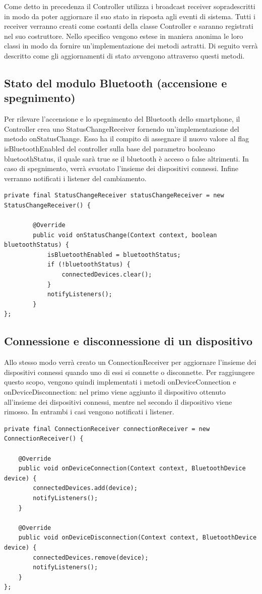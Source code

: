 Come detto in precedenza il Controller utilizza i broadcast receiver sopradescritti in modo da poter aggiornare il suo stato in risposta agli eventi di sistema. Tutti i receiver verranno creati come costanti della classe Controller e saranno registrati nel suo costruttore. Nello specifico vengono estese in maniera anonima le loro classi in modo da fornire un'implementazione dei metodi astratti. Di seguito verrà descritto come gli aggiornamenti di stato avvengono attraverso questi metodi.

\subsection{Stato del modulo Bluetooth (accensione e spegnimento)}
Per rilevare l'accensione e lo spegnimento del Bluetooth dello smartphone, il Controller crea uno StatusChangeReceiver fornendo un'implementazione del metodo onStatusChange. Esso ha il compito di assegnare il nuovo valore al flag isBluetoothEnabled del controller sulla base del parametro booleano bluetoothStatus, il quale sarà true se il bluetooth è acceso o false altrimenti. In caso di spegnimento, verrà svuotato l'insieme dei dispositivi connessi. Infine verranno notificati i listener del cambiamento.
\begin{verbatim}
private final StatusChangeReceiver statusChangeReceiver = new StatusChangeReceiver() {

        @Override
        public void onStatusChange(Context context, boolean bluetoothStatus) {
            isBluetoothEnabled = bluetoothStatus;
            if (!bluetoothStatus) {
                connectedDevices.clear();
            }
            notifyListeners();
        }
};
\end{verbatim}

\subsection{Connessione e disconnessione di un dispositivo}
Allo stesso modo verrà creato un ConnectionReceiver per aggiornare l'insieme dei dispositivi connessi quando uno di essi si connette o disconnette. Per raggiungere questo scopo, vengono quindi implementati i metodi onDeviceConnection e onDeviceDisconnection: nel primo viene aggiunto il dispositivo ottenuto all'insieme dei dispositivi connessi, mentre nel secondo il dispositivo viene rimosso. In entrambi i casi vengono notificati i listener.
\begin{verbatim}
private final ConnectionReceiver connectionReceiver = new ConnectionReceiver() {

    @Override
    public void onDeviceConnection(Context context, BluetoothDevice device) {
        connectedDevices.add(device);
        notifyListeners();
    }

    @Override
    public void onDeviceDisconnection(Context context, BluetoothDevice device) {
        connectedDevices.remove(device);
        notifyListeners();
    }
};
\end{verbatim}

